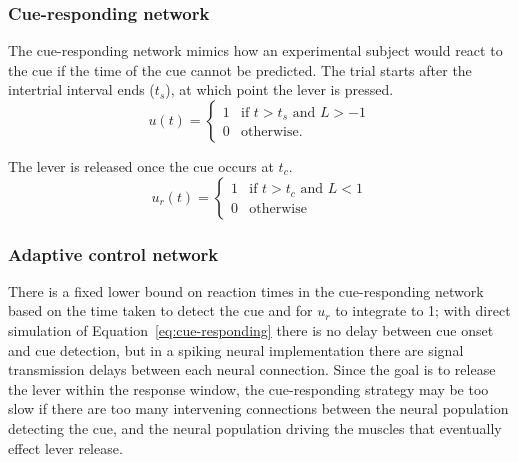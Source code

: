 \documentclass[11pt]{article}
\begin{document}
\subsubsection{Cue-responding network} \label{sec:cue-responding}

The cue-responding network
mimics how an experimental subject
would react to the cue
if the time of the cue cannot be predicted.
The trial starts after
the intertrial interval ends ($t_s$),
at which point the lever is pressed.
\begin{equation*}
  u(t) =
  \begin{cases}
    1 &\text{if } t > t_s \text{ and } L > -1 \\
    0 &\text{otherwise}.
  \end{cases}
\end{equation*}

The lever is released
once the cue occurs at $t_c$.
\begin{equation} \label{eq:cue-responding}
  u_r(t) =
  \begin{cases}
    1 &\text{if } t > t_c \text{ and } L < 1\\
    0 &\text{otherwise}
  \end{cases}
\end{equation}

\subsubsection{Adaptive control network}

There is a fixed lower bound
on reaction times in the cue-responding network
based on the time taken to detect the cue
and for $u_r$ to integrate to 1;
with direct simulation of Equation~\eqref{eq:cue-responding}
there is no delay between cue onset
and cue detection,
but in a spiking neural implementation
there are signal transmission delays
between each neural connection.
Since the goal is to release the lever
within the response window,
the cue-responding strategy
may be too slow if there are too many intervening
connections between
the neural population detecting the cue,
and the neural population driving
the muscles that eventually
effect lever release.
\end{document}
